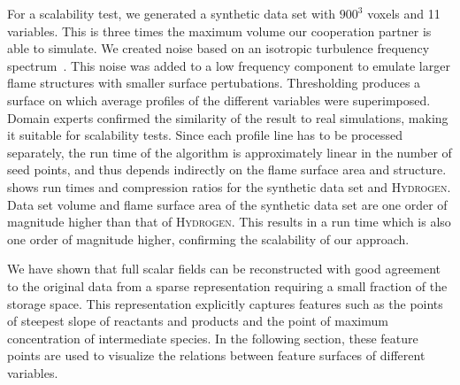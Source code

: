 For a scalability test, we generated a synthetic data set with $\text{900}^3$ voxels
and 11 variables. This is three times the maximum volume our cooperation
partner is able to simulate. We created noise based on an isotropic turbulence
frequency spectrum~\cite{Ferrante2003}. This noise was added to a low frequency
component to emulate larger flame structures with smaller surface pertubations.
Thresholding produces a surface on which average profiles of the different
variables were superimposed. Domain experts confirmed the similarity of the
result to real simulations, making it suitable for scalability tests.
Since each profile line has to be processed separately, the run time of the
algorithm is approximately linear in the number of seed points, and thus depends
indirectly on the flame surface area and structure.
 shows run times and compression ratios for
the synthetic data set and \textsc{Hydrogen}. Data set volume and flame surface
area of the synthetic data set are one order of magnitude higher than that of
\textsc{Hydrogen}. This results in a run time which is also one order of
magnitude higher, confirming the scalability of our approach.

We have shown that full scalar fields can be reconstructed with good agreement
to the original data from a sparse representation requiring a small fraction of
the storage space. This representation explicitly captures features such
as the points of steepest slope of reactants and products and the point
of maximum concentration of intermediate species. In the following section,
these feature points are used to visualize the relations between feature
surfaces of different variables.
%
%
%
